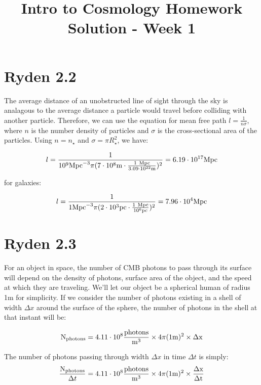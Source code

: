 \documentclass{article}
\begin{document}
\title{Intro to Cosmology Homework Solution - Week 1}
\date{}
\maketitle
\section{Ryden 2.2}
The average distance of an unobstructed line of sight through the sky is analagous to the average distance a particle would travel before colliding with another particle. Therefore, we can use the equation for mean free path $l=\frac{1}{n\sigma}$, where $n$ is the 
number density of particles and $\sigma$ is the cross-sectional area of the particles. Using $n=n_{\star}$ and $\sigma=\pi R_{\star}^2$, we have:

\begin{equation*}
l = \frac{1}{10^9 {\rm Mpc}^{-3}\pi (7\cdot10^8{\rm m}\cdot\frac{1~{\rm Mpc}}{3.09\cdot10^{22}{\rm m}})^2} = 6.19\cdot10^{17}{\rm Mpc}
\end{equation*}

for galaxies:

\begin{equation*}
l = \frac{1}{1 {\rm Mpc}^{-3}\pi (2\cdot10^3{\rm pc}\cdot\frac{1~{\rm Mpc}}{10^{6}{\rm pc}})^2} = 7.96\cdot10^{4}{\rm Mpc}
\end{equation*}

\section{Ryden 2.3}

For an object in space, the number of CMB photons to pass through its surface will depend on the density of photons, surface area of the object, and the speed at which they are traveling. We'll let our object be a spherical human of radius 1m for simplicity. If we consider the number of photons existing in a shell of width $\Delta x$ around the surface of the sphere, the number of photons in the shell at that instant will be:

\begin{equation*}
{\rm N_{photons}} = 4.11\cdot10^8 \rm{\frac{photons}{m^3}}\times 4\pi ({\rm 1m})^2 \times \Delta x
\end{equation*}

The number of photons passing through width $\Delta x $ in time $\Delta t$ is simply: 
\begin{equation*}
\frac{{\rm N_{photons}}}{\Delta t} = 4.11\cdot10^8 \rm{\frac{photons}{m^3}}\times 4\pi ({\rm 1m})^2 \times \frac{\Delta x}{\Delta t}
\end{equation*}
\end{document}
